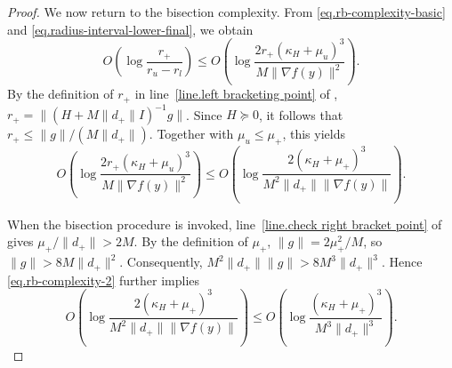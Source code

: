 \documentclass{article}
\begin{document}
\begin{proof}
    We now return to the bisection complexity. From \eqref{eq.rb-complexity-basic}
    and \eqref{eq.radius-interval-lower-final}, we obtain
    \begin{equation}
        \label{eq.rb-complexity-1}
        O\left(
        \log\frac{r_+}{r_u-r_l}
        \right)
        \le
        O\left(
        \log
        \frac{
                2r_+(\kappa_H+\mu_u)^3
            }{
                M\|\nabla f(y)\|^2
            }
        \right).
    \end{equation}
    By the definition of \(r_+\) in line~\ref{line.left bracketing point} of
    ,
    \(r_+=\|(H+M\|d_+\|I)^{-1}g\|\). Since \(H\succeq0\), it follows that
    \(r_+\le \|g\|/(M\|d_+\|)\).
    Together with \(\mu_u\le\mu_+\), this yields
    \begin{equation}
        \label{eq.rb-complexity-2}
        O\left(
        \log
        \frac{
                2r_+(\kappa_H+\mu_u)^3
            }{
                M\|\nabla f(y)\|^2
            }
        \right)
        \le
        O\left(
        \log
        \frac{
                2(\kappa_H+\mu_+)^3
            }{
                M^2\|d_+\|\|\nabla f(y)\|
            }
        \right).
    \end{equation}

    When the bisection procedure is invoked, line~\ref{line.check right bracket point}
    of  gives \(\mu_+/\|d_+\|>2M\). By the definition
    of \(\mu_+\), \(\|g\|=2\mu_+^2/M\), so \(\|g\|>8M\|d_+\|^2\).
    Consequently, \(M^2\|d_+\|\|g\|>8M^3\|d_+\|^3\).
    Hence \eqref{eq.rb-complexity-2} further implies
    \begin{equation}
        \label{eq.rb-complexity-3}
        O\left(
        \log
        \frac{
                2(\kappa_H+\mu_+)^3
            }{
                M^2\|d_+\|\|\nabla f(y)\|
            }
        \right)
        \le
        O\left(
        \log
        \frac{
                (\kappa_H+\mu_+)^3
            }{
                M^3\|d_+\|^3
            }
        \right).
    \end{equation}


\end{proof}
\end{document}
